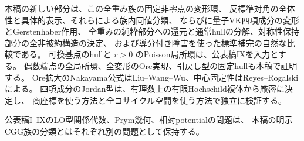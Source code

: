 本稿の新しい部分は、この全重み族の固定非零点の変形環、
反標準対角の全体性と具体的表示、それらによる族内同値分類、
ならびに量子VK四項成分の変形とGerstenhaber作用、
全重みの純粋部分への還元と通常hullの分解、対称性保持部分の全非被約構造の決定、
および導分付き障害を使った標準補完の自然な比較である。
可換基点のhullと $r>0$ のPoisson局所環は、公表稿IX\cite{VKPoisson34}を入力とする。
偶数端点の全局所環、全変形のOre実現、引戻し型の固定hullも本稿で証明する。
Ore拡大のNakayama公式はLiu--Wang--Wu\cite{LWWEndpoint37}、中心固定性はReyes--Rogalski\cite{ReyesRogalski2022}による。
四項成分のJordan型は、有理数上の有限Hochschild複体から厳密に決定し、
商座標を使う方法と全コサイクル空間を使う方法で独立に検証する。

公表稿I--IXのLO型関係代数、Prym幾何、相対potentialの問題は、
本稿の明示CGG族の分類とはそれぞれ別の問題として保持する。
